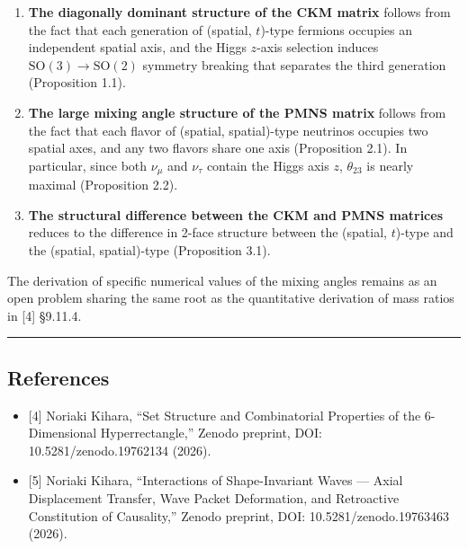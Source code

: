 \documentclass[
  a4paper,11pt]{article}
\providecommand{\tightlist}{%
  \setlength{\itemsep}{0pt}\setlength{\parskip}{0pt}}
\begin{document}
\begin{enumerate}
\def\labelenumi{\arabic{enumi}.}
\item
  \textbf{The diagonally dominant structure of the CKM matrix} follows
  from the fact that each generation of (spatial, \(t\))-type fermions
  occupies an independent spatial axis, and the Higgs \(z\)-axis
  selection induces \(\mathrm{SO}(3) \to \mathrm{SO}(2)\) symmetry
  breaking that separates the third generation (Proposition 1.1).
\item
  \textbf{The large mixing angle structure of the PMNS matrix} follows
  from the fact that each flavor of (spatial, spatial)-type neutrinos
  occupies two spatial axes, and any two flavors share one axis
  (Proposition 2.1). In particular, since both \(\nu_\mu\) and
  \(\nu_\tau\) contain the Higgs axis \(z\), \(\theta_{23}\) is nearly
  maximal (Proposition 2.2).
\item
  \textbf{The structural difference between the CKM and PMNS matrices}
  reduces to the difference in 2-face structure between the (spatial,
  \(t\))-type and the (spatial, spatial)-type (Proposition 3.1).
\end{enumerate}

The derivation of specific numerical values of the mixing angles remains
as an open problem sharing the same root as the quantitative derivation
of mass ratios in {[}4{]} §9.11.4.

\begin{center}\rule{0.5\linewidth}{0.5pt}\end{center}

\subsection{References}\label{references}

\begin{itemize}
\tightlist
\item
  {[}4{]} Noriaki Kihara, ``Set Structure and Combinatorial Properties
  of the 6-Dimensional Hyperrectangle,'' Zenodo preprint, DOI:
  10.5281/zenodo.19762134 (2026).
\item
  {[}5{]} Noriaki Kihara, ``Interactions of Shape-Invariant Waves ---
  Axial Displacement Transfer, Wave Packet Deformation, and Retroactive
  Constitution of Causality,'' Zenodo preprint, DOI:
  10.5281/zenodo.19763463 (2026).
\end{itemize}
\end{document}
